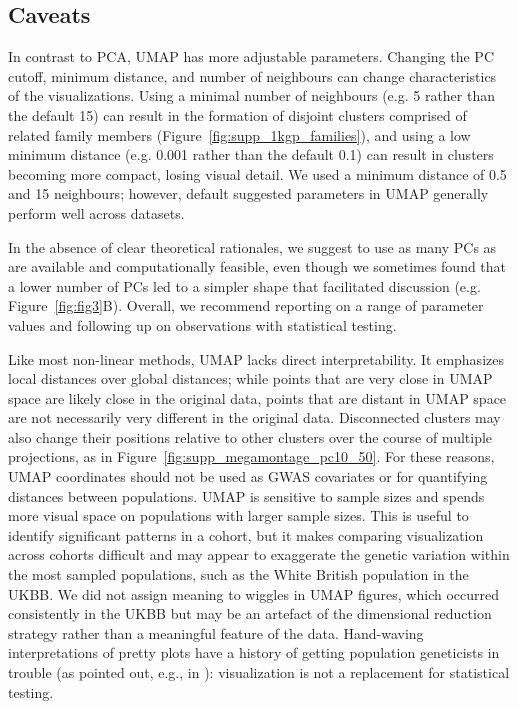 \subsection{Caveats}
In contrast to PCA, UMAP has more adjustable parameters. Changing the PC cutoff, minimum distance, and number of neighbours can change characteristics of the visualizations. Using a minimal number of neighbours (e.g. 5 rather than the default 15) can result in the formation of disjoint clusters comprised of related family members (Figure~\ref{fig:supp_1kgp_families}), and using a low minimum distance (e.g. 0.001 rather than the default 0.1) can result in clusters becoming more compact, losing visual detail. We used a minimum distance of 0.5 and 15 neighbours; however, default suggested parameters in UMAP generally perform well across datasets. 

In the absence of clear theoretical rationales, we suggest to use as many PCs as are available and computationally feasible, even though we sometimes found that a lower number of PCs led to a simpler shape that facilitated discussion (e.g. Figure~\ref{fig:fig3}B). Overall, we recommend reporting on a range of parameter values and following up on observations with statistical testing. 

Like most non-linear methods, UMAP lacks direct interpretability. It emphasizes local distances over global distances; while points that are very close in UMAP space are likely close in the original data, points that are distant in UMAP space are not necessarily very different in the original data. Disconnected clusters may also change their positions relative to other clusters over the course of multiple projections, as in Figure~\ref{fig:supp_megamontage_pc10_50}. For these reasons, UMAP coordinates should not be used as GWAS covariates or for quantifying distances between populations. UMAP is sensitive to sample sizes and spends more visual space on populations with larger sample sizes. This is useful to identify significant patterns in a cohort, but it makes comparing visualization across cohorts difficult and may appear to exaggerate the genetic variation within the most sampled populations, such as the White British population in the UKBB. We did not assign meaning to wiggles in UMAP figures, which occurred consistently in the UKBB but may be an artefact of the dimensional reduction strategy rather than a meaningful feature of the data. Hand-waving interpretations of pretty plots have a history of getting population geneticists in trouble (as pointed out, e.g., in \citep{novembre2008interpreting}): visualization is not a replacement for statistical testing.

